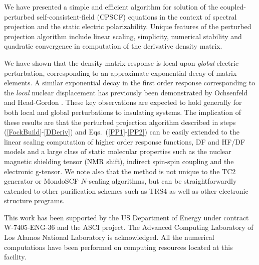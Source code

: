 \documentclass[prl,aps,twocolumn,showpacs,twocolumngrid,superbib]{revtex4}
\begin{document}
We have presented a simple and efficient algorithm for solution of the coupled-perturbed 
self-consistent-field (CPSCF) equations in the context of spectral projection and the static 
electric polarizability. Unique features of the perturbed projection algorithm include linear 
scaling, simplicity, numerical stability and quadratic convergence in computation of the derivative 
density matrix.  

We have shown that the density matrix response is local upon {\em global} electric perturbation, 
corresponding to an approximate exponential decay of matrix elements. A similar exponential decay 
in the first order response corresponding to the {\em local} nuclear displacement has previously been
demonstrated by Ochsenfeld and Head-Gordon \cite{Ochsenfeld_1997}.   These key observations are expected to
hold generally for both local and global perturbations to insulating systems.  The implication of these 
results are that the perturbed projection algorithm described in steps (\ref{FockBuild}-\ref{DDeriv}) and
Eqs.~(\ref{PP1}-\ref{PP2}) can be easily extended to the linear scaling computation of higher order 
response functions, DF and HF/DF models and a large class of static molecular properties such as the 
nuclear magnetic shielding tensor (NMR shift), indirect spin-spin coupling and the electronic g-tensor.
We note also that the method is not unique to the TC2 generator or {\sc MondoSCF} $N$-scaling algorithms, 
but can be straightforwardly extended to other purification schemes such as TRS4 \cite{ANiklasson03} as
well as other electronic structure programs.

This work has been supported by the US Department of Energy 
under contract W-7405-ENG-36 and the ASCI project.  
The Advanced Computing Laboratory of Los 
Alamos National Laboratory is acknowledged.
All the numerical computations have been
performed on computing resources located at this facility.

%


\end{document}
